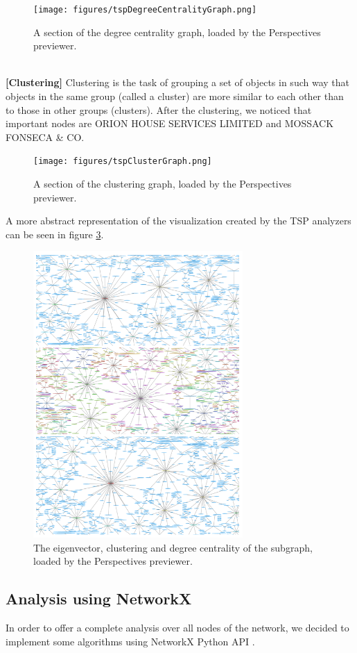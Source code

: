\documentclass[sigconf, nonacm]{acmart}
\begin{document}
\begin{figure}[htp]
    \centering
    \texttt{[image: figures/tspDegreeCentralityGraph.png]}
    \caption{A section of the degree centrality graph, loaded by the Perspectives previewer.}
    \label{fig:clusterGraph}
\end{figure}\\\textbf{[Clustering]} 
Clustering is the task of grouping a set of objects in such way that objects in the same group (called a cluster) are more similar to each other than to those in other groups (clusters). After the clustering, we noticed that important nodes are ORION HOUSE SERVICES LIMITED and MOSSACK FONSECA & CO. 
\begin{figure}[htp]
    \centering
    \texttt{[image: figures/tspClusterGraph.png]}
    \caption{A section of the clustering graph, loaded by the Perspectives previewer.}
    \label{fig:clusterGraph}
\end{figure}
A more abstract representation of the visualization created by the TSP analyzers can be seen in figure \ref{fig:tsp_analyzers}.

\begin{figure}[htp]
    \centering
    \includegraphics[width=8cm]{figures/tsp_analyzers_complete.png}
    \caption{The eigenvector, clustering and degree centrality of the subgraph, loaded by the Perspectives previewer.}
    \label{fig:tsp_analyzers}
\end{figure}

\subsection{Analysis using NetworkX}
In order to offer a complete analysis over all nodes of the network, we decided to implement some algorithms using NetworkX Python API \cite{hagberg2008exploring}.
\end{document}
